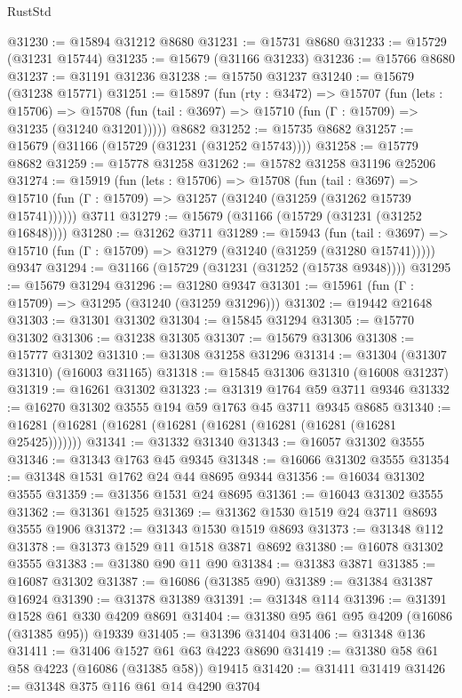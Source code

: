 \begin{lexlean}{RustStd}
\begin{coremodule}
@31230 := @15894 @31212 @8680
@31231 := @15731 @8680
@31233 := @15729 (@31231 @15744)
@31235 := @15679 (@31166 @31233)
@31236 := @15766 @8680
@31237 := @31191 @31236
@31238 := @15750 @31237
@31240 := @15679 (@31238 @15771)
@31251 := @15897
    (fun (rty : @3472) =>
    @15707
      (fun (lets : @15706) =>
      @15708 (fun (tail : @3697) => @15710 (fun (Γ : @15709) => @31235 (@31240 @31201)))))
    @8682
@31252 := @15735 @8682
@31257 := @15679 (@31166 (@15729 (@31231 (@31252 @15743))))
@31258 := @15779 @8682
@31259 := @15778 @31258
@31262 := @15782 @31258 @31196 @25206
@31274 := @15919
    (fun (lets : @15706) =>
    @15708
      (fun (tail : @3697) =>
      @15710 (fun (Γ : @15709) => @31257 (@31240 (@31259 (@31262 @15739 @15741))))))
    @3711
@31279 := @15679 (@31166 (@15729 (@31231 (@31252 @16848))))
@31280 := @31262 @3711
@31289 := @15943
    (fun (tail : @3697) => @15710 (fun (Γ : @15709) => @31279 (@31240 (@31259 (@31280 @15741)))))
    @9347
@31294 := @31166 (@15729 (@31231 (@31252 (@15738 @9348))))
@31295 := @15679 @31294
@31296 := @31280 @9347
@31301 := @15961 (fun (Γ : @15709) => @31295 (@31240 (@31259 @31296)))
@31302 := @19442 @21648
@31303 := @31301 @31302
@31304 := @15845 @31294
@31305 := @15770 @31302
@31306 := @31238 @31305
@31307 := @15679 @31306
@31308 := @15777 @31302
@31310 := @31308 @31258 @31296
@31314 := @31304 (@31307 @31310) (@16003 @31165)
@31318 := @15845 @31306 @31310 (@16008 @31237)
@31319 := @16261 @31302
@31323 := @31319 @1764 @59 @3711 @9346
@31332 := @16270 @31302 @3555 @194 @59 @1763 @45 @3711 @9345 @8685
@31340 := @16281 (@16281 (@16281 (@16281 (@16281 (@16281 (@16281 (@16281 @25425)))))))
@31341 := @31332 @31340
@31343 := @16057 @31302 @3555
@31346 := @31343 @1763 @45 @9345
@31348 := @16066 @31302 @3555
@31354 := @31348 @1531 @1762 @24 @44 @8695 @9344
@31356 := @16034 @31302 @3555
@31359 := @31356 @1531 @24 @8695
@31361 := @16043 @31302 @3555
@31362 := @31361 @1525
@31369 := @31362 @1530 @1519 @24 @3711 @8693 @3555 @1906
@31372 := @31343 @1530 @1519 @8693
@31373 := @31348 @112
@31378 := @31373 @1529 @11 @1518 @3871 @8692
@31380 := @16078 @31302 @3555
@31383 := @31380 @90 @11 @90
@31384 := @31383 @3871
@31385 := @16087 @31302
@31387 := @16086 (@31385 @90)
@31389 := @31384 @31387 @16924
@31390 := @31378 @31389
@31391 := @31348 @114
@31396 := @31391 @1528 @61 @330 @4209 @8691
@31404 := @31380 @95 @61 @95 @4209 (@16086 (@31385 @95)) @19339
@31405 := @31396 @31404
@31406 := @31348 @136
@31411 := @31406 @1527 @61 @63 @4223 @8690
@31419 := @31380 @58 @61 @58 @4223 (@16086 (@31385 @58)) @19415
@31420 := @31411 @31419
@31426 := @31348 @375 @116 @61 @14 @4290 @3704

\end{coremodule}
\end{lexlean}
